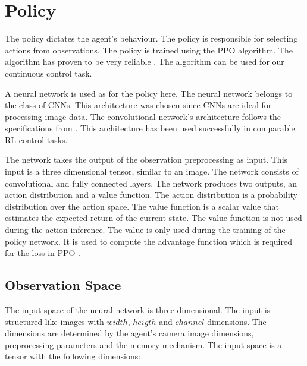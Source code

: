 
\section{Policy}
\label{fig:policy_description}

The policy dictates the agent's behaviour. The policy is responsible for selecting actions from observations. The policy is trained using the \ac{PPO} algorithm. The algorithm has proven to be very reliable \textcite{ppo}. The algorithm can be used for our continuous control task.

A neural network is used as for the policy here. The neural network belongs to the class of \acp{CNN}. This architecture was chosen since \ac{CNN}s are ideal for processing image data. The convolutional network's architecture follows the specifications from \textcite{human_level_control}. This architecture has been used successfully in comparable \ac{RL} control tasks.

The network takes the output of the observation preprocessing as input. This input is a three dimensional tensor, similar to an image. The network consists of convolutional and fully connected layers. The network produces two outputs, an action distribution and a value function. The action distribution is a probability distribution over the action space.
The value function is a scalar value that estimates the expected return of the current state. The value function is not used during the action inference. The value is only used during the training of the policy network. It is used to compute the advantage function which is required for the loss in \ac{PPO} \textcite{ppo}.






\subsection{Observation Space}

The input space of the neural network is three dimensional. The input is structured like images with $width$, $heigth$ and $channel$ dimensions. The dimensions are determined by the agent's camera image dimensions, preprocessing parameters and the memory mechanism. The input space is a tensor with the following dimensions:

